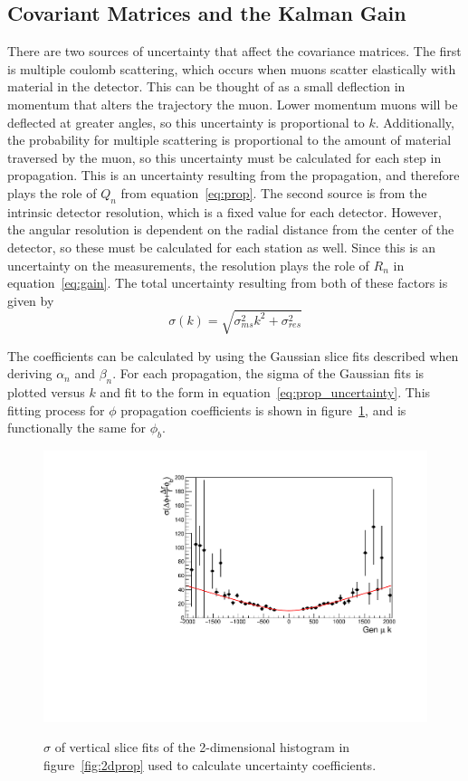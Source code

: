 \subsection{Covariant Matrices and the Kalman Gain} \label{sec:kbmtf_cov}
There are two sources of uncertainty that affect the covariance matrices. The first is multiple coulomb scattering, which occurs when muons scatter elastically with material in the detector. This can be thought of as a small deflection in momentum that alters the trajectory the muon. Lower momentum muons will be deflected at greater angles, so this uncertainty is proportional to $k$. Additionally, the probability for multiple scattering is proportional to the amount of material traversed by the muon, so this uncertainty must be calculated for each step in propagation. This is an uncertainty resulting from the propagation, and therefore plays the role of $Q_n$ from equation~\ref{eq:prop}. The second source is from the intrinsic detector resolution, which is a fixed value for each detector. However, the angular resolution is dependent on the radial distance from the center of the detector, so these must be calculated for each station as well. Since this is an uncertainty on the measurements, the resolution plays the role of $R_n$ in equation~\ref{eq:gain}. The total uncertainty resulting from both of these factors is given by
\begin{equation}
	\label{eq:prop_uncertainty}
	\sigma(k)=\sqrt{\sigma_{ms}^2k^2+\sigma_{res}^2}
\end{equation}

The coefficients can be calculated by using the Gaussian slice fits described when deriving $\alpha_n$ and $\beta_n$. For each propagation, the sigma of the Gaussian fits is plotted versus $k$ and fit to the form in equation~\ref{eq:prop_uncertainty}. This fitting process for $\phi$ propagation coefficients is shown in figure~\ref{fig:phi_uncertainty}, and is functionally the same for $\phi_b$.

\begin{figure}[htb!]
	\centering
	\includegraphics[width=0.45\linewidth]{figs/04_muons/phiprop_sigma.pdf}
	\label{fig:2dprop_sigma}
	\caption[$\sigma$ of vertical slice fits of the 2-dimensional histogram in figure~\ref{fig:2dprop} used to calculate uncertainty coefficients.]
	{$\sigma$ of vertical slice fits of the 2-dimensional histogram in figure~\ref{fig:2dprop} used to calculate uncertainty coefficients.}
	\label{fig:phi_uncertainty}
\end{figure}

